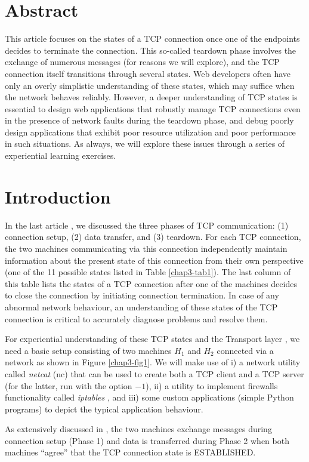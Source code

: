 \begin{multicols}{2}

\setcounter{figure}{0}
\section*{Abstract}

This article focuses on the states of a TCP connection once one of the endpoints decides to terminate the connection. This so-called teardown phase involves the exchange of numerous messages (for reasons we will explore), and the TCP connection itself transitions through several states. Web developers often have only an overly simplistic understanding of these states, which may suffice when the network behaves reliably. However, a deeper understanding of TCP states is essential to design web applications that robustly manage TCP connections even in the presence of network faults during the teardown phase, and debug poorly design applications that exhibit poor resource utilization and poor performance in such situations. As always, we will explore these issues through a series of experiential learning exercises.

\section{Introduction}


In the last article \cite{chap3-key8}, we discussed the three phases of TCP \cite{chap3-key1} communication: (1) connection setup, (2) data transfer, and (3) teardown. For each TCP connection, the two machines communicating via this connection independently maintain information about the present state of this connection from their own perspective (one of the 11 possible states listed in Table \ref{chap3-tab1}). The last column of this table lists the states of a TCP connection after one of the machines decides to close the connection by initiating connection termination. In case of any abnormal network behaviour, an understanding of these states of the TCP connection is critical to accurately diagnose problems and resolve them.

For experiential understanding of these TCP states and the Transport layer \cite{chap3-key2}, we need a basic setup consisting of two machines $H_{1}$ and $H_{2}$ connected via a network as shown in Figure \ref{chap3-fig1}. We will make use of i) a network utility called \textit{netcat} (nc) \cite{chap3-key5}\cite{chap3-key6} that can be used to create both a TCP client and a TCP server (for the latter, run with the option $-1$), ii) a utility to implement firewalls functionality called \textit{iptables} \cite{chap3-key7}, and iii) some custom applications (simple Python programs) to depict the typical application behaviour.

As extensively discussed in \cite{chap3-key8}, the two machines exchange messages during connection setup (Phase 1) and data is transferred during Phase 2 when both machines ``agree'' that the TCP connection state is ESTABLISHED.
\end{multicols}

